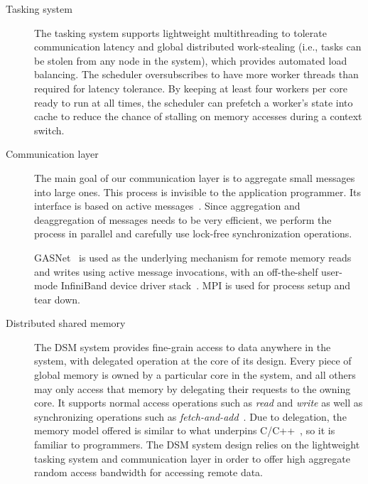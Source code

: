 \begin{description}

\item [Tasking system] The tasking system supports lightweight multithreading
to tolerate communication latency and global distributed work-stealing (i.e.,
tasks can be stolen from any node in the system), which provides automated
load balancing. The scheduler oversubscribes to have more worker threads than
required for latency tolerance. By keeping at least four workers per 
core ready to run at all times, the scheduler can prefetch a worker's state
into cache to reduce the chance of stalling on memory accesses during a
context switch.

\item[Communication layer] The main goal of our communication layer is to
aggregate small messages into large ones. This process is invisible to the
application programmer. Its interface is based on active
messages~\cite{vonEicken92}. Since aggregation and deaggregation of messages
needs to be very efficient, we perform the process in parallel and carefully
use lock-free synchronization operations. 

GASNet~\cite{gasnet} is used as the
underlying mechanism for remote memory reads and writes using active message
invocations, with an off-the-shelf user-mode InfiniBand device driver
stack~\cite{OFED}. MPI is used for process setup and tear down.


\item[Distributed shared memory] The DSM system provides fine-grain access to
data anywhere in the system, with delegated operation at the core of its design.
Every piece of global memory is owned by a particular core in the system, and all others may only access that memory by delegating their requests to the owning core.
It supports normal access operations such as
\emph{read\/} and \emph{write\/} as well as synchronizing operations such as
\emph{fetch-and-add\/}~\cite{fetchandadd}. Due to delegation, the memory model offered is similar to what underpins
C/C++~\cite{N2480,N2800}, so it is familiar to programmers. The DSM system
design relies on the lightweight tasking system and communication layer in
order to offer high aggregate random access bandwidth for accessing remote
data.

\end{description}

